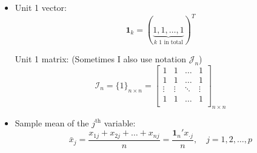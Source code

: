     \begin{itemize}[topsep=6pt,itemsep=4pt]
        \item Unit 1 vector:
        \begin{equation}
            \mathbf{1}_k=(\underbrace{1,1,\ldots,1}_{k\text{ 1 in total}})^T
        \end{equation}

        Unit 1 matrix: (Sometimes I also use notation $ \mathcal{J}_n $)
        \begin{equation}\label{EqaAllOneMatrix}
            \mathcal{I}_n  = \{1\}_{n\times n}=\begin{bmatrix}
            1&1&\ldots&1\\
            1&1&\ldots&1\\
            \vdots&\vdots&\ddots&\vdots\\
            1&1&\ldots&1\\
            \end{bmatrix}_{n\times n}
        \end{equation}


        \item Sample mean of the $ j^\mathrm{th} $ variable:
        \begin{equation}
            \bar{x}_j=\dfrac{x_{1j}+x_{2j}+\ldots+x_{nj}}{n}=\dfrac{\mathbf{1}_n'x_{\cdot j}}{n},\quad j=1,2,\ldots,p
        \end{equation}
        

\end{itemize}
